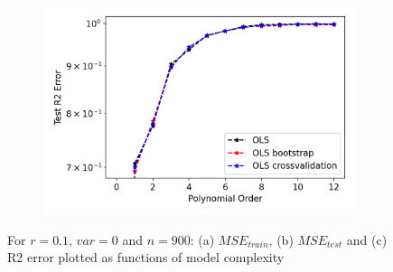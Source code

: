 \begin{figure}
\begin{subfigure}{.5\textwidth}
  \centering
  \includegraphics[width=.9\linewidth]{Images/ols10.png}
  \caption{}
  \label{fig:ols10}
\end{subfigure}
\caption{For $r=0.1$, $var=0$ and $n=900$: (a) $MSE_{train}$, (b) $MSE_{test}$ and (c) R2 error plotted as functions of model complexity}
\label{fig:OLS_resample}
\end{figure}



